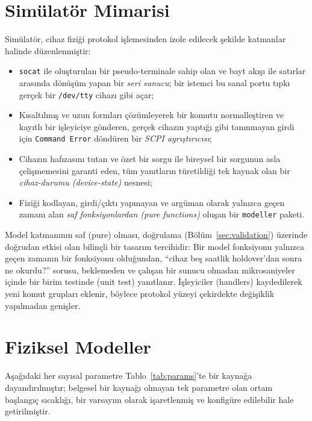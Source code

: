 \documentclass[conference]{IEEEtran}
\begin{document}
\section{Simülatör Mimarisi}
\label{sec:arch}
Simülatör, cihaz fiziği protokol işlemesinden izole edilecek şekilde katmanlar halinde düzenlenmiştir:
\begin{itemize}
\item \texttt{socat} ile oluşturulan bir pseudo-terminale sahip olan ve bayt akışı ile satırlar arasında dönüşüm yapan bir \emph{seri sunucu}; bir istemci bu sanal portu tıpkı gerçek bir \texttt{/dev/tty} cihazı gibi açar;
\item Kısaltılmış ve uzun formları çözümleyerek bir komutu normalleştiren ve kayıtlı bir işleyiciye gönderen, gerçek cihazın yaptığı gibi tanınmayan girdi için \texttt{Command Error} döndüren bir \emph{SCPI ayrıştırıcısı};
\item Cihazın hafızasını tutan ve özet bir sorgu ile bireysel bir sorgunun asla çelişmemesini garanti eden, tüm yanıtların türetildiği tek kaynak olan bir \emph{cihaz-durumu (device-state)} nesnesi;
\item Fiziği kodlayan, girdi/çıktı yapmayan ve argüman olarak yalnızca geçen zamanı alan \emph{saf fonksiyonlardan (pure functions)} oluşan bir \texttt{modeller} paketi.
\end{itemize}
Model katmanının saf (pure) olması, doğrulama (Bölüm~\ref{sec:validation}) üzerinde doğrudan etkisi olan bilinçli bir tasarım tercihidir: Bir model fonksiyonu yalnızca geçen zamanın bir fonksiyonu olduğundan, ``cihaz beş saatlik holdover'dan sonra ne okurdu?'' sorusu, beklemeden ve çalışan bir sunucu olmadan mikrosaniyeler içinde bir birim testinde (unit test) yanıtlanır. İşleyiciler (handlers) kaydedilerek yeni komut grupları eklenir, böylece protokol yüzeyi çekirdekte değişiklik yapılmadan genişler.

\section{Fiziksel Modeller}
\label{sec:models}
Aşağıdaki her sayısal parametre Tablo~\ref{tab:params}'te bir kaynağa dayandırılmıştır; belgesel bir kaynağı olmayan tek parametre olan ortam başlangıç sıcaklığı, bir varsayım olarak işaretlenmiş ve konfigüre edilebilir hale getirilmiştir.
\end{document}
